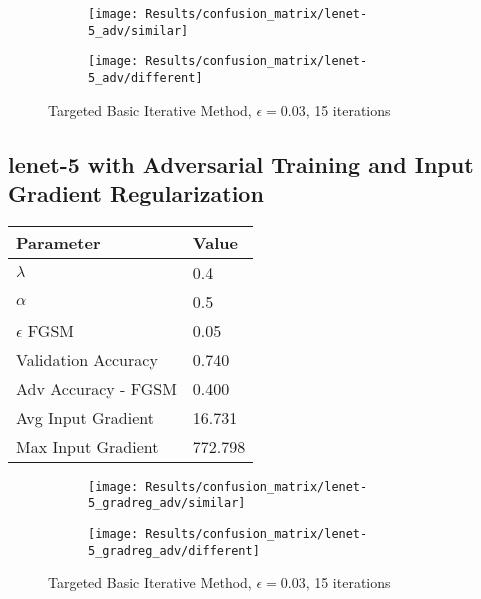 \documentclass[draft,final]{vutinfth} %
\begin{document}
\begin{figure}[h]
  \begin{subfigure}[b]{0.75\columnwidth}
		\centering
    \texttt{[image: Results/confusion\_matrix/lenet-5\_adv/similar]}
    \label{fig:exp:cm:lenet-5_adv:similar}
  \end{subfigure}
  \begin{subfigure}[b]{0.75\columnwidth}
		\centering
    \texttt{[image: Results/confusion\_matrix/lenet-5\_adv/different]}
    \label{fig:exp:cm:lenet-5_adv:different}
  \end{subfigure}
  \caption{Targeted Basic Iterative Method, $\epsilon = 0.03$, 15 iterations}
  \label{fig:exp:cm:lenet-5_adv}
\end{figure}

\subsection{lenet-5 with Adversarial Training and Input Gradient Regularization}

\begin{table}[h]
  \centering
  \begin{tabular}{ll}
    \toprule
			Parameter			& Value   \\
    \midrule
			$\lambda$								& 0.4			\\
			$\alpha$								& 0.5			\\
			$\epsilon$ FGSM					& 0.05		\\
			
			Validation Accuracy			& 0.740		\\ 
			Adv Accuracy - FGSM			& 0.400		\\
			
			Avg Input Gradient			& 16.731	\\
			Max Input Gradient			& 772.798	\\
    \bottomrule
  \end{tabular}
\end{table}


\begin{figure}[h]
  \begin{subfigure}[b]{0.75\columnwidth}
		\centering
    \texttt{[image: Results/confusion\_matrix/lenet-5\_gradreg\_adv/similar]}
    \label{fig:exp:cm:lenet-5_gradreg_adv:similar}
  \end{subfigure}
  \begin{subfigure}[b]{0.75\columnwidth}
		\centering
    \texttt{[image: Results/confusion\_matrix/lenet-5\_gradreg\_adv/different]}
    \label{fig:exp:cm:lenet-5_gradreg_adv:different}
  \end{subfigure}
  \caption{Targeted Basic Iterative Method, $\epsilon = 0.03$, 15 iterations}
  \label{fig:exp:cm:lenet-5_gradreg_adv}
\end{figure}
\end{document}
